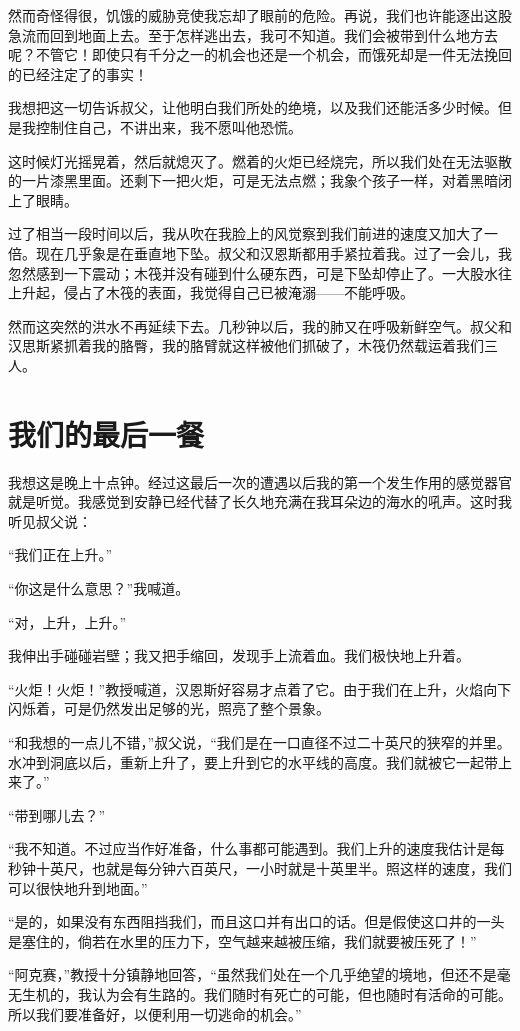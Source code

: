 \documentclass[10pt]{book}
\begin{document}
然而奇怪得很，饥饿的威胁竞使我忘却了眼前的危险。再说，我们也许能逐出这股急流而回到地面上去。至于怎样逃出去，我可不知道。我们会被带到什么地方去呢？不管它！即使只有千分之一的机会也还是一个机会，而饿死却是一件无法挽回的已经注定了的事实！

我想把这一切告诉叔父，让他明白我们所处的绝境，以及我们还能活多少时候。但是我控制住自己，不讲出来，我不愿叫他恐慌。

这时候灯光摇晃着，然后就熄灭了。燃着的火炬已经烧完，所以我们处在无法驱散的一片漆黑里面。还剩下一把火炬，可是无法点燃；我象个孩子一样，对着黑暗闭上了眼睛。

过了相当一段时间以后，我从吹在我脸上的风觉察到我们前进的速度又加大了一倍。现在几乎象是在垂直地下坠。叔父和汉恩斯都用手紧拉着我。过了一会儿，我忽然感到一下震动；木筏并没有碰到什么硬东西，可是下坠却停止了。一大股水往上升起，侵占了木筏的表面，我觉得自己已被淹溺——不能呼吸。

然而这突然的洪水不再延续下去。几秒钟以后，我的肺又在呼吸新鲜空气。叔父和汉思斯紧抓着我的胳臀，我的胳臂就这样被他们抓破了，木筏仍然载运着我们三人。
\chapter{我们的最后一餐}
我想这是晚上十点钟。经过这最后一次的遭遇以后我的第一个发生作用的感觉器官就是听觉。我感觉到安静已经代替了长久地充满在我耳朵边的海水的吼声。这时我听见叔父说：

“我们正在上升。”

“你这是什么意思？”我喊道。

“对，上升，上升。”

我伸出手碰碰岩壁；我又把手缩回，发现手上流着血。我们极快地上升着。

“火炬！火炬！”教授喊道，汉恩斯好容易才点着了它。由于我们在上升，火焰向下闪烁着，可是仍然发出足够的光，照亮了整个景象。

“和我想的一点儿不错，”叔父说，“我们是在一口直径不过二十英尺的狭窄的并里。水冲到洞底以后，重新上升了，要上升到它的水平线的高度。我们就被它一起带上来了。”

“带到哪儿去？”

“我不知道。不过应当作好准备，什么事都可能遇到。我们上升的速度我估计是每秒钟十英尺，也就是每分钟六百英尺，一小时就是十英里半。照这样的速度，我们可以很快地升到地面。”

“是的，如果没有东西阻挡我们，而且这口并有出口的话。但是假使这口井的一头是塞住的，倘若在水里的压力下，空气越来越被压缩，我们就要被压死了！”

“阿克赛，”教授十分镇静地回答，“虽然我们处在一个几乎绝望的境地，但还不是毫无生机的，我认为会有生路的。我们随时有死亡的可能，但也随时有活命的可能。所以我们要准备好，以便利用一切逃命的机会。”
\end{document}
